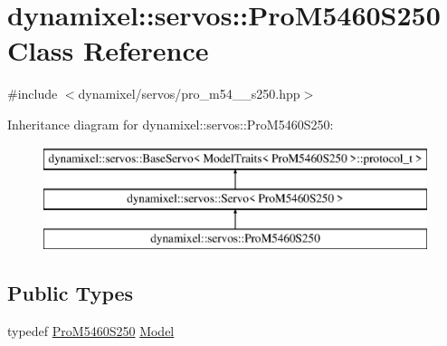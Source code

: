 \hypertarget{classdynamixel_1_1servos_1_1_pro_m5460_s250}{}\section{dynamixel\+:\+:servos\+:\+:Pro\+M5460\+S250 Class Reference}
\label{classdynamixel_1_1servos_1_1_pro_m5460_s250}


{\ttfamily \#include $<$dynamixel/servos/pro\+\_\+m54\+\_\+\_\+s250.\+hpp$>$}

Inheritance diagram for dynamixel\+:\+:servos\+:\+:Pro\+M5460\+S250\+:\begin{figure}[H]
\begin{center}
\leavevmode
\includegraphics[height=3.000000cm]{classdynamixel_1_1servos_1_1_pro_m5460_s250}
\end{center}
\end{figure}
\subsection*{Public Types}
\begin{DoxyCompactItemize}
\item 
typedef \hyperlink{classdynamixel_1_1servos_1_1_pro_m5460_s250}{Pro\+M5460\+S250} \hyperlink{classdynamixel_1_1servos_1_1_pro_m5460_s250_a99797d680a3d653e54cb396207b7e7a7}{Model}
\end{DoxyCompactItemize}
